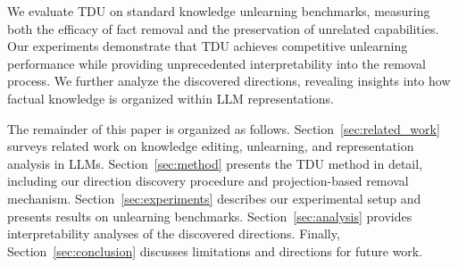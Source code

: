 We evaluate TDU on standard knowledge unlearning benchmarks, measuring both the efficacy of fact removal and the preservation of unrelated capabilities. Our experiments demonstrate that TDU achieves competitive unlearning performance while providing unprecedented interpretability into the removal process. We further analyze the discovered directions, revealing insights into how factual knowledge is organized within LLM representations.

The remainder of this paper is organized as follows. Section~\ref{sec:related_work} surveys related work on knowledge editing, unlearning, and representation analysis in LLMs. Section~\ref{sec:method} presents the TDU method in detail, including our direction discovery procedure and projection-based removal mechanism. Section~\ref{sec:experiments} describes our experimental setup and presents results on unlearning benchmarks. Section~\ref{sec:analysis} provides interpretability analyses of the discovered directions. Finally, Section~\ref{sec:conclusion} discusses limitations and directions for future work.
